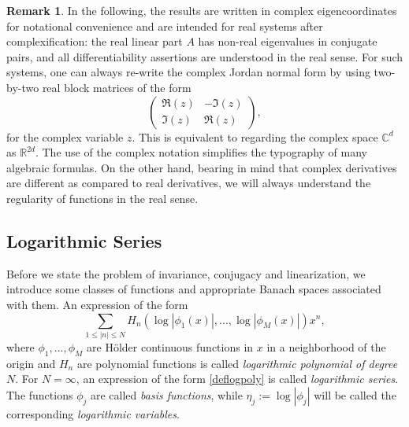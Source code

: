 \documentclass{amsart}
\theoremstyle{plain}
\theoremstyle{definition}
\newtheorem{remark}[theorem]{Remark}
\begin{document}
\begin{remark}
In the following, the results are written in complex eigencoordinates for notational convenience and are intended for real systems after complexification: the real linear part $A$ has non-real eigenvalues in conjugate pairs, and all differentiability assertions are understood in the real sense. For such systems, one can always re-write the complex Jordan normal form by using two-by-two real block matrices of the form
\begin{equation}
    \begin{pmatrix} \Re(z)& -\Im(z) \\  \Im(z) & \Re(z)  \end{pmatrix} ,
\end{equation}
for the complex variable $z$. This is equivalent to regarding the complex space $\mathbb{C}^d$ as $\mathbb{R}^{2d}$. The use of the complex notation simplifies the typography of 
many algebraic formulas. On the other hand, bearing in mind that complex derivatives are different as compared to real derivatives, we will always understand the regularity of functions in the real sense.
\end{remark}

\subsection{Logarithmic Series}

Before we state the problem of invariance, conjugacy and linearization, we introduce some classes of functions and appropriate Banach spaces associated with them. An expression of the form
\begin{equation}\label{deflogpoly}
\sum_{1\leq |n|\leq N} H_n(\log|\phi_1(x)|,...,\log|\phi_M(x)|)x^n,
\end{equation}
where $\phi_1,...,\phi_M$ are H\"{o}lder continuous functions in $x$ in a neighborhood of the origin and $H_n$ are polynomial functions is called \emph{logarithmic polynomial of degree $N$}. For $N=\infty$, an expression of the form \eqref{deflogpoly} is called \emph{logarithmic series}. The functions $\phi_j$ are called \emph{basis functions}, while $\eta_j:=\log|\phi_j|$ will be called the corresponding \emph{logarithmic variables}.
\end{document}
